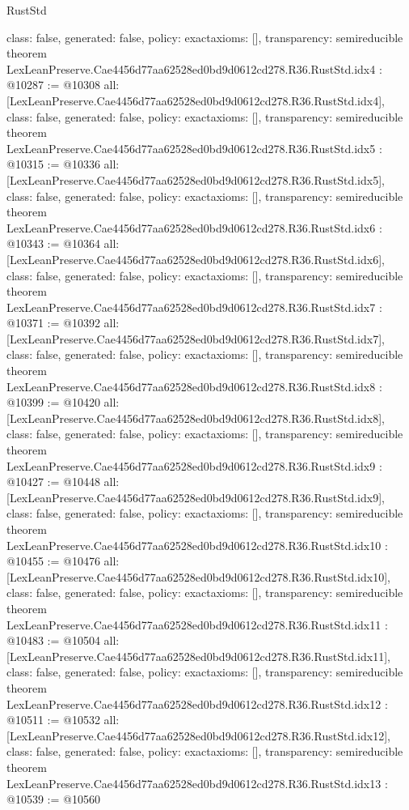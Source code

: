 \begin{lexlean}{RustStd}
\begin{coremodule}
{  class: false,
  generated: false,
  policy: exact{axioms: []},
  transparency: semireducible
}
theorem LexLeanPreserve.Cae4456d77aa62528ed0bd9d0612cd278.R36.RustStd.idx4 : @10287 := @10308 {
  all: [LexLeanPreserve.Cae4456d77aa62528ed0bd9d0612cd278.R36.RustStd.idx4],
  class: false,
  generated: false,
  policy: exact{axioms: []},
  transparency: semireducible
}
theorem LexLeanPreserve.Cae4456d77aa62528ed0bd9d0612cd278.R36.RustStd.idx5 : @10315 := @10336 {
  all: [LexLeanPreserve.Cae4456d77aa62528ed0bd9d0612cd278.R36.RustStd.idx5],
  class: false,
  generated: false,
  policy: exact{axioms: []},
  transparency: semireducible
}
theorem LexLeanPreserve.Cae4456d77aa62528ed0bd9d0612cd278.R36.RustStd.idx6 : @10343 := @10364 {
  all: [LexLeanPreserve.Cae4456d77aa62528ed0bd9d0612cd278.R36.RustStd.idx6],
  class: false,
  generated: false,
  policy: exact{axioms: []},
  transparency: semireducible
}
theorem LexLeanPreserve.Cae4456d77aa62528ed0bd9d0612cd278.R36.RustStd.idx7 : @10371 := @10392 {
  all: [LexLeanPreserve.Cae4456d77aa62528ed0bd9d0612cd278.R36.RustStd.idx7],
  class: false,
  generated: false,
  policy: exact{axioms: []},
  transparency: semireducible
}
theorem LexLeanPreserve.Cae4456d77aa62528ed0bd9d0612cd278.R36.RustStd.idx8 : @10399 := @10420 {
  all: [LexLeanPreserve.Cae4456d77aa62528ed0bd9d0612cd278.R36.RustStd.idx8],
  class: false,
  generated: false,
  policy: exact{axioms: []},
  transparency: semireducible
}
theorem LexLeanPreserve.Cae4456d77aa62528ed0bd9d0612cd278.R36.RustStd.idx9 : @10427 := @10448 {
  all: [LexLeanPreserve.Cae4456d77aa62528ed0bd9d0612cd278.R36.RustStd.idx9],
  class: false,
  generated: false,
  policy: exact{axioms: []},
  transparency: semireducible
}
theorem LexLeanPreserve.Cae4456d77aa62528ed0bd9d0612cd278.R36.RustStd.idx10 : @10455 := @10476 {
  all: [LexLeanPreserve.Cae4456d77aa62528ed0bd9d0612cd278.R36.RustStd.idx10],
  class: false,
  generated: false,
  policy: exact{axioms: []},
  transparency: semireducible
}
theorem LexLeanPreserve.Cae4456d77aa62528ed0bd9d0612cd278.R36.RustStd.idx11 : @10483 := @10504 {
  all: [LexLeanPreserve.Cae4456d77aa62528ed0bd9d0612cd278.R36.RustStd.idx11],
  class: false,
  generated: false,
  policy: exact{axioms: []},
  transparency: semireducible
}
theorem LexLeanPreserve.Cae4456d77aa62528ed0bd9d0612cd278.R36.RustStd.idx12 : @10511 := @10532 {
  all: [LexLeanPreserve.Cae4456d77aa62528ed0bd9d0612cd278.R36.RustStd.idx12],
  class: false,
  generated: false,
  policy: exact{axioms: []},
  transparency: semireducible
}
theorem LexLeanPreserve.Cae4456d77aa62528ed0bd9d0612cd278.R36.RustStd.idx13 : @10539 := @10560 {
}
\end{coremodule}
\end{lexlean}
